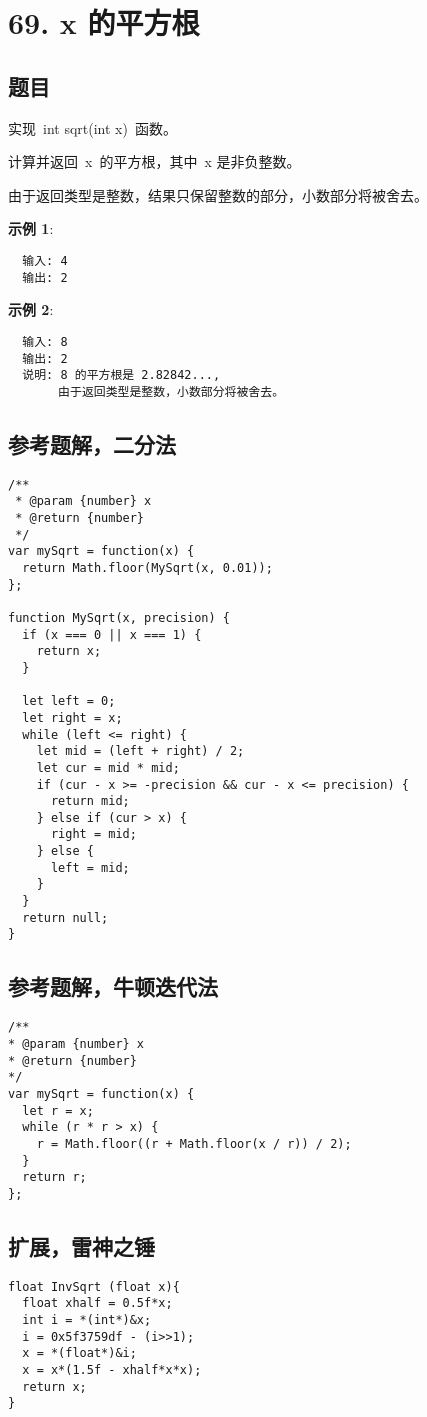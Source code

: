 \newpage
\section{69. x 的平方根}
\label{leetcode:69}

\subsection{题目}

实现 int sqrt(int x) 函数。

计算并返回 x 的平方根，其中 x 是非负整数。

由于返回类型是整数，结果只保留整数的部分，小数部分将被舍去。

\textbf{示例 1}:

\begin{verbatim}
  输入: 4
  输出: 2
\end{verbatim}

\textbf{示例 2}:

\begin{verbatim}
  输入: 8
  输出: 2
  说明: 8 的平方根是 2.82842..., 
       由于返回类型是整数，小数部分将被舍去。
\end{verbatim}

\subsection{参考题解，二分法}

\begin{verbatim}
/**
 * @param {number} x
 * @return {number}
 */
var mySqrt = function(x) {
  return Math.floor(MySqrt(x, 0.01));
};

function MySqrt(x, precision) {
  if (x === 0 || x === 1) {
    return x;
  }

  let left = 0;
  let right = x;
  while (left <= right) {
    let mid = (left + right) / 2;
    let cur = mid * mid;
    if (cur - x >= -precision && cur - x <= precision) {
      return mid;
    } else if (cur > x) {
      right = mid;
    } else {
      left = mid;
    }
  }
  return null;
}
\end{verbatim}

\subsection{参考题解，牛顿迭代法}

\begin{verbatim}
/**
* @param {number} x
* @return {number}
*/
var mySqrt = function(x) {
  let r = x;
  while (r * r > x) {
    r = Math.floor((r + Math.floor(x / r)) / 2);
  }
  return r;
};
\end{verbatim}

\subsection{扩展，雷神之锤}

\begin{verbatim}
float InvSqrt (float x){
  float xhalf = 0.5f*x;
  int i = *(int*)&x;
  i = 0x5f3759df - (i>>1);
  x = *(float*)&i;
  x = x*(1.5f - xhalf*x*x);
  return x;
}
\end{verbatim}
